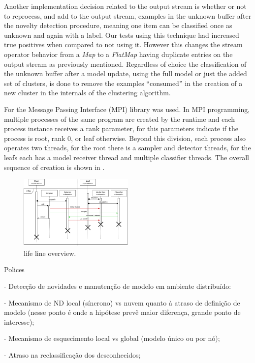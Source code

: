 \documentclass[conference]{IEEEtran}
\begin{document}
Another implementation decision related to the output stream is whether or not
to reprocess, and add to the output stream, examples in the unknown buffer after
the novelty detection procedure, meaning one item can be classified once as
unknown and again with a label.
Our tests using this technique had increased true positives when compared to
not using it.
However this changes the stream operator behavior from a \textit{Map} to a
\textit{FlatMap} having duplicate entries on the output stream as previously
mentioned.
Regardless of choice the classification of the unknown buffer after a model
update, using the full model or just the added set of clusters, is done to
remove the examples ``consumed'' in the creation of a new cluster in the internals
of the clustering algorithm.


For \mfog the Message Passing Interface (MPI) library was used.
In MPI programming, multiple processes of the same program are created by the
runtime and each process instance receives a rank parameter, for \mfog this
parameters indicate if the process is root, rank $0$, or leaf otherwise.
Beyond this division, each process also operates two threads, for the root
there is a sampler and detector threads, for the leafs each has a model receiver
thread and multiple classifier threads.
The overall sequence of creation is shown in .

\begin{figure}[htb]
  \centerline{\includegraphics[width=0.5\textwidth]{figures/mfog-arch-mpi.png}}
  \caption{\mfog life line overview.}
  \label{fig:mfog-mpi-life}
\end{figure}

\begin{highlight}
Polices

- Detecção de novidades e manutenção de modelo em ambiente distribuído:

  - Mecanismo de ND local (síncrono) vs nuvem quanto à atraso de definição de modelo
    (nesse ponto é onde a hipótese prevê maior diferença, grande ponto de interesse);

  - Mecanismo de esquecimento local vs global (modelo único ou por nó);

  - Atraso na reclassificação dos desconhecidos;
\end{highlight}
\end{document}
